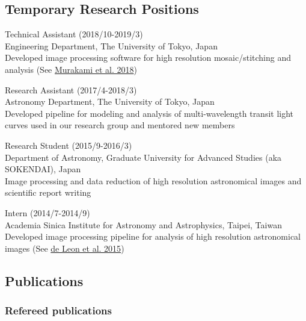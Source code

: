 \documentclass[12pt,letterpaper]{article}
\begin{document}
\subsection{Temporary Research Positions}
\begin{list}{}{\cvlist}
\item Technical Assistant (2018/10-2019/3)\\
      Engineering Department, The University of Tokyo, Japan\\
      Developed image processing software for high resolution mosaic/stitching and analysis (See \href{\spieurl}{Murakami et al. 2018})
\item Research Assistant (2017/4-2018/3)\\	
      Astronomy Department, The University of Tokyo, Japan\\
      Developed pipeline for modeling and analysis of multi-wavelength transit light curves used in our research group and mentored new members
\item Research Student (2015/9-2016/3)\\
      Department of Astronomy, Graduate University for Advanced Studies (aka SOKENDAI), Japan\\
      Image processing and data reduction of high resolution astronomical images and scientific report writing
\item Intern (2014/7-2014/9)\\
      Academia Sinica Institute for Astronomy and Astrophysics, Taipei, Taiwan\\	
      Developed image processing pipeline for analysis of high resolution astronomical images (See \href{\paperone}{de Leon et al. 2015})
\end{list}

%   

\ifdefined\withpubs
  \subsection{Publications}
  

  \subsubsection{Refereed publications}
  \begin{list}{}{\cvlist}
    
  \end{list}
\end{document}
